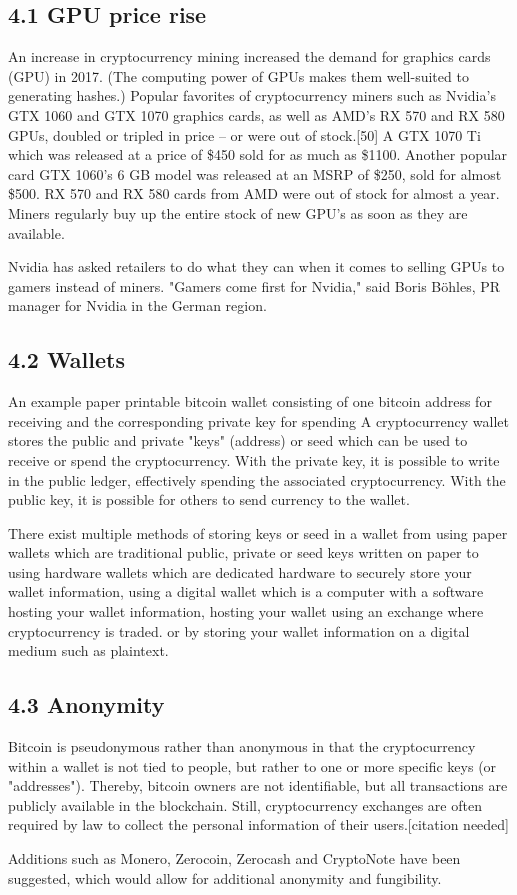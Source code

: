\subsection*{4.1 GPU price rise}
An increase in cryptocurrency mining increased the demand for graphics cards (GPU) in 2017. (The computing power of GPUs makes them well-suited to generating hashes.) Popular favorites of cryptocurrency miners such as Nvidia's GTX 1060 and GTX 1070 graphics cards, as well as AMD's RX 570 and RX 580 GPUs, doubled or tripled in price – or were out of stock.[50] A GTX 1070 Ti which was released at a price of \$450 sold for as much as \$1100. Another popular card GTX 1060's 6 GB model was released at an MSRP of \$250, sold for almost \$500. RX 570 and RX 580 cards from AMD were out of stock for almost a year. Miners regularly buy up the entire stock of new GPU's as soon as they are available.

Nvidia has asked retailers to do what they can when it comes to selling GPUs to gamers instead of miners. "Gamers come first for Nvidia," said Boris Böhles, PR manager for Nvidia in the German region.

\subsection*{4.2 Wallets}

An example paper printable bitcoin wallet consisting of one bitcoin address for receiving and the corresponding private key for spending
A cryptocurrency wallet stores the public and private "keys" (address) or seed which can be used to receive or spend the cryptocurrency. With the private key, it is possible to write in the public ledger, effectively spending the associated cryptocurrency. With the public key, it is possible for others to send currency to the wallet.

There exist multiple methods of storing keys or seed in a wallet from using paper wallets which are traditional public, private or seed keys written on paper to using hardware wallets which are dedicated hardware to securely store your wallet information, using a digital wallet which is a computer with a software hosting your wallet information, hosting your wallet using an exchange where cryptocurrency is traded. or by storing your wallet information on a digital medium such as plaintext.

\subsection*{4.3 Anonymity}
Bitcoin is pseudonymous rather than anonymous in that the cryptocurrency within a wallet is not tied to people, but rather to one or more specific keys (or "addresses"). Thereby, bitcoin owners are not identifiable, but all transactions are publicly available in the blockchain. Still, cryptocurrency exchanges are often required by law to collect the personal information of their users.[citation needed]

Additions such as Monero, Zerocoin, Zerocash and CryptoNote have been suggested, which would allow for additional anonymity and fungibility.